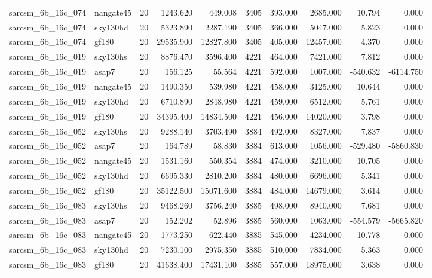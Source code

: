 \begin{longtable}{llrrrrrrrr}
sarcsm\_6b\_16c\_074 & nangate45 & 20 & 1243.620 & 449.008 & 3405 & 393.000 & 2685.000 & 10.794 & 0.000 \\
sarcsm\_6b\_16c\_074 & sky130hd & 20 & 5323.890 & 2287.190 & 3405 & 366.000 & 5047.000 & 5.823 & 0.000 \\
sarcsm\_6b\_16c\_074 & gf180 & 20 & 29535.900 & 12827.800 & 3405 & 405.000 & 12457.000 & 4.370 & 0.000 \\
sarcsm\_6b\_16c\_019 & sky130hs & 20 & 8876.470 & 3596.400 & 4221 & 464.000 & 7421.000 & 7.812 & 0.000 \\
sarcsm\_6b\_16c\_019 & asap7 & 20 & 156.125 & 55.564 & 4221 & 592.000 & 1007.000 & -540.632 & -6114.750 \\
sarcsm\_6b\_16c\_019 & nangate45 & 20 & 1490.350 & 539.980 & 4221 & 458.000 & 3125.000 & 10.644 & 0.000 \\
sarcsm\_6b\_16c\_019 & sky130hd & 20 & 6710.890 & 2848.980 & 4221 & 459.000 & 6512.000 & 5.761 & 0.000 \\
sarcsm\_6b\_16c\_019 & gf180 & 20 & 34395.400 & 14834.500 & 4221 & 456.000 & 14020.000 & 3.798 & 0.000 \\
sarcsm\_6b\_16c\_052 & sky130hs & 20 & 9288.140 & 3703.490 & 3884 & 492.000 & 8327.000 & 7.837 & 0.000 \\
sarcsm\_6b\_16c\_052 & asap7 & 20 & 164.789 & 58.830 & 3884 & 613.000 & 1056.000 & -529.480 & -5860.830 \\
sarcsm\_6b\_16c\_052 & nangate45 & 20 & 1531.160 & 550.354 & 3884 & 474.000 & 3210.000 & 10.705 & 0.000 \\
sarcsm\_6b\_16c\_052 & sky130hd & 20 & 6695.330 & 2810.200 & 3884 & 480.000 & 6696.000 & 5.341 & 0.000 \\
sarcsm\_6b\_16c\_052 & gf180 & 20 & 35122.500 & 15071.600 & 3884 & 484.000 & 14679.000 & 3.614 & 0.000 \\
sarcsm\_6b\_16c\_083 & sky130hs & 20 & 9468.260 & 3756.240 & 3885 & 498.000 & 8940.000 & 7.681 & 0.000 \\
sarcsm\_6b\_16c\_083 & asap7 & 20 & 152.202 & 52.896 & 3885 & 560.000 & 1063.000 & -554.579 & -5665.820 \\
sarcsm\_6b\_16c\_083 & nangate45 & 20 & 1773.250 & 622.440 & 3885 & 545.000 & 4234.000 & 10.778 & 0.000 \\
sarcsm\_6b\_16c\_083 & sky130hd & 20 & 7230.100 & 2975.350 & 3885 & 510.000 & 7834.000 & 5.363 & 0.000 \\
sarcsm\_6b\_16c\_083 & gf180 & 20 & 41638.400 & 17431.100 & 3885 & 557.000 & 18975.000 & 3.638 & 0.000 \\

\end{longtable}
